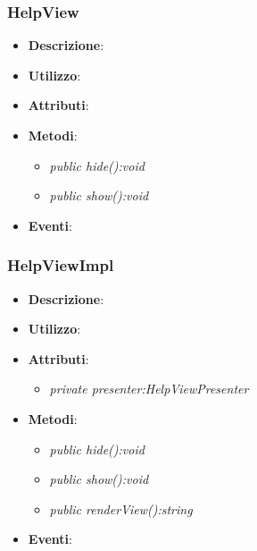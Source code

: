 \subsubsection{HelpView}
\begin{itemize}
\item \textbf{Descrizione}: 
\item \textbf{Utilizzo}:
\item \textbf{Attributi}:
\item \textbf{Metodi}:
	\begin{itemize}
	\item \textit{public hide():void}\\
	
	\item \textit{public show():void}\\

	\end{itemize}
\item \textbf{Eventi}:
\end{itemize}

\subsubsection{HelpViewImpl}
\begin{itemize}
\item \textbf{Descrizione}: 
\item \textbf{Utilizzo}:
\item \textbf{Attributi}:
\begin{itemize}
\item \textit{private presenter:HelpViewPresenter}\\

\end{itemize}
\item \textbf{Metodi}:
	\begin{itemize}
	\item \textit{public hide():void}\\
	
	\item \textit{public show():void}\\

	\item \textit{public renderView():string}\\
	
	\end{itemize}
\item \textbf{Eventi}:
\end{itemize}

